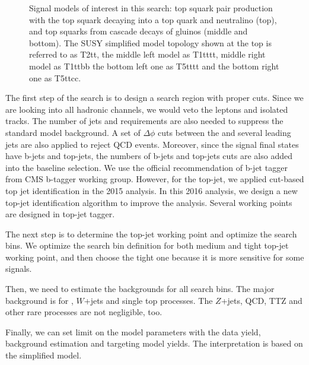 \begin{figure}[ht!]
\begin{centering}
\caption{Signal models of interest in this search:
top squark pair production with the top squark decaying into a top quark and
neutralino (top),
and top squarks from cascade decays of gluinos (middle and bottom).
The SUSY simplified model topology shown at the top is referred to as T2tt,
the middle left model as T1tttt, middle right model as T1ttbb
the bottom left one as T5tttt and the bottom right one as T5ttcc.}
\label{fig:signal_diagrams}
\end{centering}
\end{figure}

The first step of the search is to design a search region with proper cuts. Since we are looking into all hadronic channels, we would veto the leptons and isolated tracks. The number of jets and \MET requirements are also needed to suppress the standard model background. A set of $\Delta\phi$ cuts between the \MET and several leading jets are also applied to reject QCD events. Moreover, since the signal final states have b-jets and top-jets, the numbers of b-jets and top-jets cuts are also added into the baseline selection. We use the official recommendation of b-jet tagger from CMS b-tagger working group. However, for the top-jet, we applied cut-based top jet identification in the 2015 analysis\cite{PhysRevD.96.012004}. In this 2016 analysis, we design a new top-jet identification algorithm to improve the analysis. Several working points are designed in top-jet tagger.

The next step is to determine the top-jet working point and optimize the search bins. We optimize the search bin definition for both medium and tight top-jet working point, and then choose the tight one because it is more sensitive for some signals.

Then, we need to estimate the backgrounds for all search bins. The major background is for \ttbar, $W$+jets and single top processes. The $Z$+jets, QCD, TTZ and other rare processes are not negligible, too.

Finally, we can set limit on the model parameters with the data yield, background estimation and targeting model yields. The interpretation is based on the simplified model\cite{Alwall:2008ag}.

